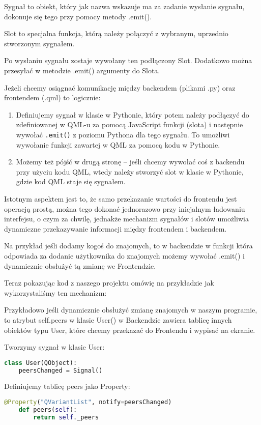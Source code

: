 Sygnał to obiekt, który jak nazwa wskazuje ma za zadanie wysłanie sygnału,
dokonuje się tego przy pomocy metody .emit().

Slot to specjalna funkcja, którą należy połączyć z wybranym, uprzednio stworzonym sygnałem.

Po wysłaniu sygnału zostaje wywołany ten podłączony Slot. Dodatkowo można przesyłać w metodzie .emit() argumenty do Slota.

Jeżeli chcemy osiągnać komunikację między backendem (plikami .py) oraz frontendem (.qml) to logicznie:

\begin{enumerate}
    \item Definiujemy sygnał w klasie w Pythonie, który potem należy podłączyć do zdefiniowanej w QML-u za pomocą JavaScript funkcji (slota) i następnie wywołać \texttt{.emit()} z poziomu Pythona dla tego sygnału. To umożliwi wywołanie funkcji zawartej w QML za pomocą kodu w Pythonie.
    \item Możemy też pójść w drugą stronę – jeśli chcemy wywołać coś z backendu przy użyciu kodu QML, wtedy należy stworzyć slot w klasie w Pythonie, gdzie kod QML staje się sygnałem.
\end{enumerate}

Istotnym aspektem jest to, że samo przekazanie wartości do frontendu jest operacją prostą, można tego dokonać jednorazowo przy inicjalnym ładowaniu interfejsu, o czym za chwilę, jednakże mechanizm sygnałów i slotów umożliwia dynamiczne przekazywanie informacji między frontendem i backendem.

Na przykład jeśli dodamy kogoś do znajomych, to w backendzie w funkcji która odpowiada za dodanie użytkownika do znajomych możemy wywołać .emit() i dynamicznie obsłużyć tą zmianę we Frontendzie.

Teraz pokazując kod z naszego projektu omówię na przykładzie jak wykorzystaliśmy ten mechanizm:

Przykładowo jeśli dynamicznie obsłużyć zmianę znajomych w naszym programie, to atrybut self.peers w klasie User() w Backendzie zawiera tablicę innych obiektów typu User, które chcemy przekazać do Frontendu i wypisać na ekranie.

Tworzymy sygnał w klasie User:
\begin{lstlisting}[language=Python, caption={Sygnał User}]
class User(QObject):
    peersChanged = Signal()
\end{lstlisting}    

Definiujemy tablicę peers jako Property:
\begin{lstlisting}[language=Python, caption={Peers Property}]
@Property("QVariantList", notify=peersChanged)
    def peers(self):
        return self._peers
\end{lstlisting}

